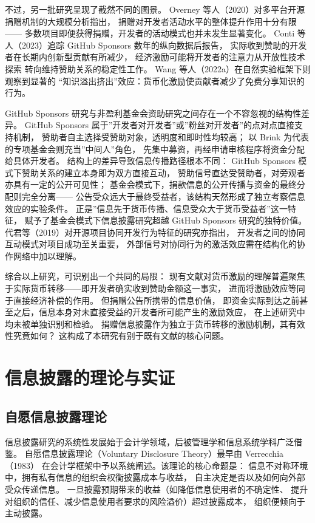 不过，另一批研究呈现了截然不同的图景。
Overney 等人（2020）对多平台开源捐赠机制的大规模分析指出，
捐赠对开发者活动水平的整体提升作用十分有限——
多数项目即便获得捐赠，开发者的活动模式也并未发生显著变化\cite{overney2020not}。
Conti 等人（2023）追踪 GitHub Sponsors 数年的纵向数据后报告，
实际收到赞助的开发者在长期内创新型贡献有所减少，
经济激励可能将开发者的注意力从开放性技术探索
转向维持赞助关系的稳定性工作\cite{conti2023incentivizing}。
Wang 等人（2022a）在自然实验框架下则观察到显著的
“知识溢出挤出”效应：货币化激励使贡献者减少了免费分享知识的行为\cite{wang2022monetary}。

GitHub Sponsors 研究与非盈利基金会资助研究之间存在一个不容忽视的结构性差异。
GitHub Sponsors 属于”开发者对开发者”或”粉丝对开发者”的点对点直接支持机制，
赞助者自主选择受赞助对象，透明度和即时性均较高；
以 Brink 为代表的专项基金会则充当”中间人”角色，
先集中募资，再经申请审核程序将资金分配给具体开发者。
结构上的差异导致信息传播路径根本不同：
GitHub Sponsors 模式下赞助关系的建立本身即为双方直接互动，
赞助信号直达受赞助者，对旁观者亦具有一定的公开可见性；
基金会模式下，捐款信息的公开传播与资金的最终分配则完全分离——
公告受众远大于最终受益者，该结构天然形成了独立考察信息效应的实验条件。
正是”信息先于货币传播、信息受众大于货币受益者”这一特征，
赋予了基金会模式下信息披露研究超越 GitHub Sponsors 研究的独特价值。
代君等（2019）对开源项目协同开发行为特征的研究亦指出，
开发者之间的协同互动模式对项目成功至关重要，
外部信号对协同行为的激活效应需在结构化的协作网络中加以理解\cite{dai2019collaborative}。

综合以上研究，可识别出一个共同的局限：
现有文献对货币激励的理解普遍聚焦于实际货币转移——即开发者确实收到赞助金额这一事实，
进而将激励效应等同于直接经济补偿的作用。
但捐赠公告所携带的信息价值，
即资金实际到达之前甚至之后，信息本身对未直接受益的开发者所可能产生的激励效应，
在上述研究中均未被单独识别和检验。
捐赠信息披露作为独立于货币转移的激励机制，其有效性究竟如何？
这构成了本研究有别于既有文献的核心问题。

\section{信息披露的理论与实证}

\subsection{自愿信息披露理论}

信息披露研究的系统性发展始于会计学领域，后被管理学和信息系统学科广泛借鉴。
自愿信息披露理论（Voluntary Disclosure Theory）最早由 Verrecchia（1983）
在会计学框架中予以系统阐述\cite{verrecchia1983discretionary}。该理论的核心命题是：
信息不对称环境中，拥有私有信息的组织会权衡披露成本与收益，
自主决定是否以及如何向外部受众传递信息。
一旦披露预期带来的收益（如降低信息使用者的不确定性、
提升对组织的信任、减少信息使用者要求的风险溢价）超过披露成本，
组织便倾向于主动披露\cite{verrecchia1983discretionary}。

